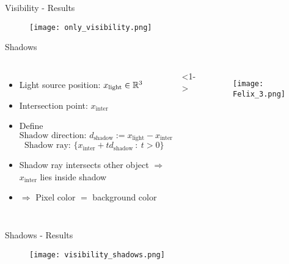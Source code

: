 \begin{frame}{Visibility - Results}
    \begin{figure}
                \centering
                \texttt{[image: only\_visibility.png]}
            \end{figure}
\end{frame}

\begin{frame}{Shadows}
    \begin{columns}
        \begin{itemize}
        \item<1-> Light source position: $x_{\text{light}}\in\mathbb{R}^3$
        \item<2-> Intersection point: $x_{\text{inter}}$
        \item<3-> Define
        $$
        \text{Shadow direction: }d_{\text{shadow}} := x_{\text{light}} - x_{\text{inter}}
        $$
        $$
        \text{Shadow ray: }\{x_{\text{inter}} + t d_{\text{shadow}} \ : \ t > 0\}
        $$
        \item<4-> Shadow ray intersects other object $\Rightarrow$ $x_{\text{inter}}$ lies inside shadow
        \item<5-> $\Rightarrow$ Pixel color $=$ background color
        \end{itemize}
        <1->
        \begin{figure}
                \centering
                \texttt{[image: Felix\_3.png]}
            \end{figure}
    \end{columns}
\end{frame}

\begin{frame}{Shadows - Results}
    \begin{figure}
                \centering
                \texttt{[image: visibility\_shadows.png]}
            \end{figure}
\end{frame}

